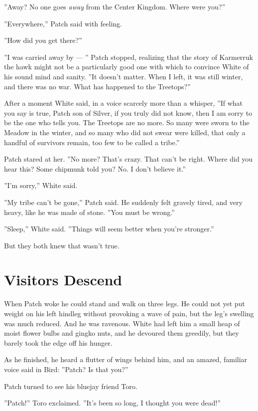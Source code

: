 \documentclass[12pt]{book}
\begin{document}
''Away? No one goes {\it away} from the Center Kingdom. Where were you?''

''Everywhere,'' Patch said with feeling.

''How did you get there?''

''I was carried away by ---
'' Patch stopped, realizing that the story of Karmerruk the hawk might not be a particularly good one with which to convince White of his sound mind and sanity. ''It doesn't matter. When I left, it was still winter, and there was no war. What has happened to the Treetops?''

After a moment White said, in a voice scarcely more than a whisper, ''If what you say is true, Patch son of Silver, if you truly did not know, then I am sorry to be the one who tells you. The Treetops are no more. So many were sworn to the Meadow in the winter, and so many who did not swear were killed, that only a handful of survivors remain, too few to be called a tribe.''

Patch stared at her. ''No more? That's crazy. That can't be right. Where did you hear this? Some chipmunk told you? No. I don't believe it.''

''I'm sorry,'' White said.

''My tribe can't be gone,'' Patch said. He suddenly felt gravely tired, and very heavy, like he was made of stone. ''You must be wrong.''

''Sleep,'' White said. ''Things will seem better when you're stronger.''

But they both knew that wasn't true.


\section{Visitors Descend}

When Patch woke he could stand and walk on three legs. He could not yet put weight on his left hindleg without provoking a wave of pain, but the leg's swelling was much reduced. And he was ravenous. White had left him a small heap of moist flower bulbs and gingko nuts, and he devoured them greedily, but they barely took the edge off his hunger.

As he finished, he heard a flutter of wings behind him, and an amazed, familiar voice said in Bird: ''Patch? Is that you?''

Patch turned to see his bluejay friend Toro.

''Patch!'' Toro exclaimed. ''It's been so long, I thought you were dead!''
\end{document}

